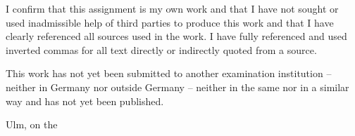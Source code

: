\documentclass[BCOR20mm,DIV14,10pt,headinclude,footexclude,bibtotoc,liststotoc]{article}
\begin{document}
I confirm that this assignment is my own work and that I have not sought or used
inadmissible help of third parties to produce this work and that I have clearly
referenced all sources used in the work. I have fully referenced and used
inverted commas for all text directly or indirectly quoted from a source.

This work has not yet been submitted to another examination institution –
neither in Germany nor outside Germany – neither in the same nor in a similar
way and has not yet been published.

\vspace{2cm}

Ulm, on the \dotfill

\hspace{10cm} {\footnotesize \theauthor}
\end{document}
